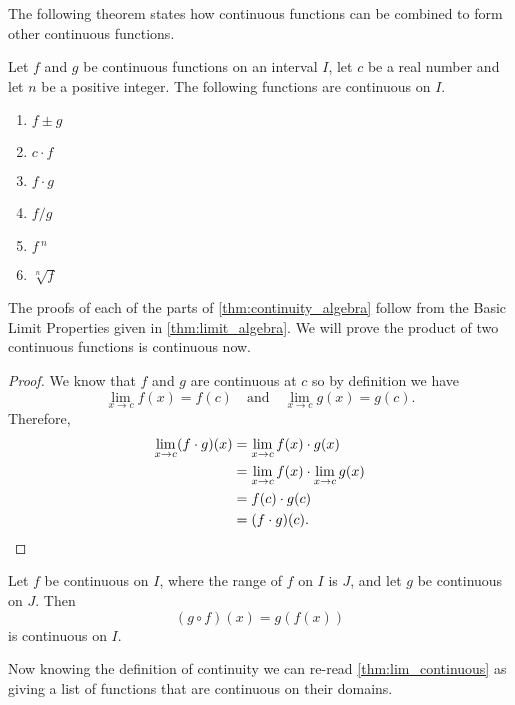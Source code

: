 The following theorem states how continuous functions can be combined to form other continuous functions.

\begin{theorem}\label{thm:continuity_algebra}
Let $f$ and $g$ be continuous functions on an interval $I$, let $c$ be a real number and let $n$ be a positive integer. The following functions are continuous on $I$.
\begin{enumerate}
	\item	{} $f\pm g$
	\item	{} $c\cdot f$
	\item	{} $f\cdot g$
	\item	{}	$f/g$ 
	\item	{} $f\,^n$
	\item	{}	$\sqrt[n]{f}$ 
\end{enumerate}
\end{theorem}

The proofs of each of the parts of \autoref{thm:continuity_algebra} follow from the Basic Limit Properties given in \autoref{thm:limit_algebra}. We will prove the product of two continuous functions is continuous now.

\begin{proof}
We know that $f$ and $g$ are continuous at $c$ so by definition we have
\[\lim_{x\to c}f(x)=f(c) \quad \text{and} \quad \lim_{x\to c} g(x)=g(c).\]
Therefore,
\begin{align*}
\lim_{x\to c} (f\cdot g)(x)&=\lim_{x\to c} f(x)\cdot g(x)\\
&=\lim_{x\to c}f(x) \cdot \lim_{x\to c} g(x)\\
&=f(c)\cdot g(c)\\
&=(f\cdot g)(c).\qedhere
\end{align*}
\end{proof}

\begin{theorem}\label{thm:composition_continuous}
Let $f$ be continuous on $I$, where the range of $f$ on $I$ is $J$, and let $g$ be continuous on $J$. Then \[(g\circ f)(x)=g(f(x))\] is continuous on $I$.
\end{theorem}

Now knowing the definition of continuity we can re-read \autoref{thm:lim_continuous} as giving a list of functions that are continuous on their domains.

